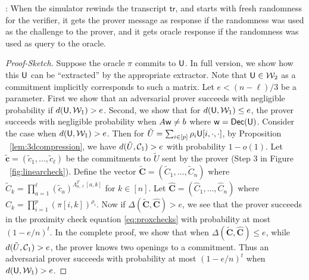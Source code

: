 : When the simulator rewinds the transcript $\mathsf{tr}$,
and starts with fresh randomness for the verifier, it gets the prover message as
response if the randomness was used as the challenge to the prover, and it gets
oracle response if the randomness was used as query to the oracle.

\begin{proof}[Proof-Sketch]
Suppose the oracle $\pi$ commits to $\mathsf{U}$. In full version, we show how
 this $\mathsf{U}$ can be ``extracted'' by the appropriate extractor. Note that $\mathsf{U}\in
\mathcal{W}_2$ as a commitment implicitly corresponds to such a matrix. Let $e<(n-\ell)/3$ be a parameter. First we show that 
an adversarial prover succeeds with negligible probability if $d(\mathsf{U},\mathcal{W}_1)>e$. Second, we
show that for $d(\mathsf{U},\mathcal{W}_1)\leq e$, the prover succeeds with negligible probability when
$A\mathsf{w}\neq b$ where $\mathsf{w}=\mathsf{Dec}(\mathsf{U})$. Consider the case when $d(\mathsf{U},\mathcal{W}_1)>e$. Then for
$\tilde{U}=\sum_{i\in [p]}\rho_i\mathsf{U}[i,\cdot,\cdot]$, by Proposition ~\ref{lem:3dcompression},
 we have $d(\tilde{U},\mathcal{C}_1)>e$ with probability $1-o(1)$. Let $\tilde{\bm{c}}=(\tilde{c}_1,
\ldots,\tilde{c}_\ell)$ be the commitments to $\tilde{U}$ sent by the prover
(Step 3 in Figure ~\ref{fig:linearcheck}). Define 
the vector $\tilde{\bm{C}}=(\tilde{C}_1,\ldots,\tilde{C}_n)$ where
$\tilde{C}_k=\prod_{a=1}^\ell (\tilde{c}_a)^{\Lambda_{n,\ell}^T[a,k]}$ for $k\in [n]$.
 Let $\hat{\bm{C}}=(\hat{C}_1,\ldots,\hat{C}_n)$ where
$\hat{C}_k=\prod_{i=1}^p(\pi[i,k])^{\rho_i}$. Now if
$\Delta(\tilde{\bm{C}},\hat{\bm{C}})>e$, we see that the prover succeeds in the
proximity check equation \eqref{eq:proxchecks} with probability at most $(1-e/n)^t$. 
In the complete
proof, we show that when $\Delta(\tilde{\bm{C}},\hat{\bm{C}})\leq e$, 
while $d(\tilde{U},\mathcal{C}_1)>e$, the prover knows two openings to a commitment.
Thus an adversarial prover succeeds with probability at most $(1-e/n)^t$ when
$d(\mathsf{U},\mathcal{W}_1)>e$.


\end{proof}
